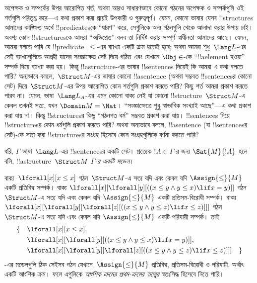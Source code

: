 \documentclass[../../../include/open-logic-section]{subfiles}
\begin{document}


\begin{explain}
অপেক্ষক ও সম্পর্কের উপর আরোপিত শর্ত, অথবা আরও সাধারণভাবে কোনো গঠনের
অপেক্ষক ও সম্পর্কগুলি ওই শর্তগুলি পরিতৃপ্ত করে—এ কথা প্রকাশ করা প্রায়ই
উপকারী ও গুরুত্বপূর্ণ। যেমন, কোনো ভাষার যেসব !!{structure}s আমাদের
কাঙ্ক্ষিত অর্থে !!{predicate}sকে “ধারণ” করে, সেগুলিকে অন্য
গঠনগুলি থেকে আলাদা করার উপায় চাই। অবশ্য কোন !!{structure}sকে
আমরা “অভিপ্রেত” বলব তা নির্দিষ্ট করার সম্পূর্ণ স্বাধীনতা আমাদের আছে।
যেমন, আমরা বলতে পারি যে !!{predicate}~$\le$-এর ব্যাখ্যা একটি ক্রম হতেই
হবে; অথবা আমরা শুধু~$\Lang L$-এর সেই ব্যাখ্যাগুলিতে আগ্রহী যাদের
সংজ্ঞাক্ষেত্র সেট দিয়ে গঠিত এবং যেখানে $\Obj \in$-কে
“!!a{element} হওয়া” সম্পর্ক দিয়ে ব্যাখ্যা করা হয়। কিন্তু
!!a{structure}-এর ভাষার !!{sentence}s দিয়েই কি আমরা এ কথা বলতে পারি?
অন্যভাবে বললে,~$\Struct M$-এর ভাষার কোনো !!a{sentence} (অথবা সম্ভবত
!!{sentence}sর কোনো সেট) দিয়ে~$\Struct M$-এর উপর আরোপিত কোন
শর্তগুলি প্রকাশ করতে পারি? কিছু শর্ত আমরা প্রকাশ করতে পারব না। যেমন,
ভাষা~$\Lang L_A$-এর এমন কোনো বাক্য নেই যা কোনো
!!{structure}~$\Struct M$-এ কেবল তখনই সত্য, যখন $\Domain M = \Nat$।
“সংজ্ঞাক্ষেত্রে শুধু স্বাভাবিক সংখ্যাই আছে”—এ কথা প্রকাশ করা যায় না।
কিন্তু !!{structure}sর কিছু “গঠনগত ধর্ম” সম্ভবত প্রকাশ করা যায়।
!!{sentence}s দিয়ে !!{structure}sর কোন ধর্মগুলি প্রকাশ করতে পারি?
অথবা অন্যভাবে বললে, !!a{sentence} (বা !!{sentence}sর সেট)-কে সত্য
করা !!{structure}sর সংগ্রহ হিসেবে কোন সংগ্রহগুলিকে বর্ণনা করতে পারি?
\end{explain}

\begin{defn}[কোনো সেটের মডেল]
ধরি, $\Gamma$ ভাষা~$\Lang L$-এর !!{sentence}sর একটি সেট।
প্রত্যেক $!A \in \Gamma$-র জন্য $\Sat{M}{!A}$ হলে বলি,
!!a{structure}~$\Struct M$ \emph{$\Gamma$-র একটি মডেল}।
\end{defn}

\begin{ex}
বাক্য~$\lforall[x][x \le x]$ গঠন~$\Struct M$-এ সত্য যদি এবং কেবল যদি
$\Assign{\le}{M}$ একটি প্রতিবিম্ব সম্পর্ক। বাক্য
$\lforall[x][\lforall[y][((x \le y \land y \le x) \lif x = y)]]$
গঠন~$\Struct M$-এ সত্য যদি এবং কেবল যদি $\Assign{\le}{M}$ একটি
প্রতিসম-বিরোধী সম্পর্ক। বাক্য
$\lforall[x][\lforall[y][\lforall[z][((x \le y \land y \le z)
      \lif x \le z)]]]$ গঠন~$\Struct M$-এ সত্য যদি এবং কেবল যদি
$\Assign{\le}{M}$ একটি পরিযায়ী সম্পর্ক। তাই
\begin{align*}
\{\quad &\lforall[x][x \le x], \\
   & \lforall[x][\lforall[y][((x \le y \land y \le
    x) \lif x = y)]], \\
   &\lforall[x][\lforall[y][\lforall[z][((x \le y
      \land y \le z) \lif x \le z)]]] \quad \}
\end{align*}
-এর মডেলগুলি ঠিক সেইসব গঠন যেখানে~$\Assign{\le}{M}$ প্রতিবিম্ব,
প্রতিসম-বিরোধী ও পরিযায়ী, অর্থাৎ একটি আংশিক ক্রম। ফলে এগুলিকে
\emph{আংশিক ক্রমের প্রথম-ক্রমের তত্ত্বের} স্বতঃসিদ্ধ হিসেবে নিতে পারি।
\end{ex}
\end{document}
